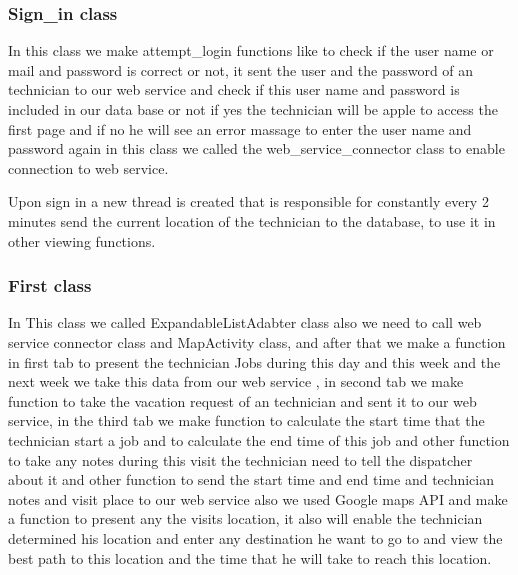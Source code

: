 	\subsubsection{Sign\_in class}
		In this class we make attempt\_login functions like to check if the user name or mail and password is correct or not, it sent the user and the password of an technician to our web service and check if this user name and password is included in our data base or not if yes the technician will be apple to access the first page and if no he will see an error massage to enter the user name and password again in this class we called the web\_service\_connector class to enable connection to web service.
		
		Upon sign in a new thread is created that is responsible for constantly every 2 minutes send the current location of the technician to the database, to use it in other viewing functions.
		 
	\subsubsection{First class}
		In This class we called ExpandableListAdabter class also we need to call web service connector class and MapActivity class, and after that we make a function in first tab to present the technician Jobs during this day and this week and the next week we take this data from our web service , in second tab we make function to take the vacation request of an technician and sent it to our web service, in the third tab we make function to calculate the start time that the technician start a job and to calculate the end time of this job and other function to take any notes during this visit the technician need to tell the dispatcher about it and other function to send the start time and end time and technician notes and visit place to our web service also we used Google maps API and make a function to present any the visits location, it also will enable the technician determined his location and enter any destination he want to go to and view the best path to this location and the time that he will take to reach this location.